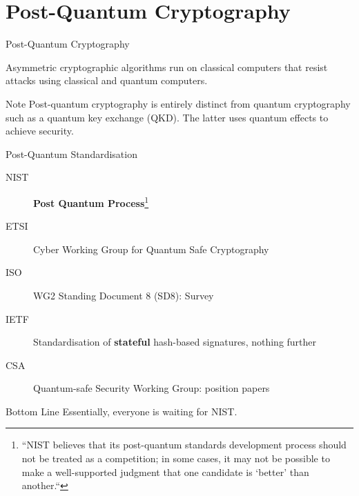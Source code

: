\documentclass[xcolor=table,10pt,aspectratio=169]{beamer}
\begin{document}
\section{Post-Quantum Cryptography}
\label{sec:org4abc2d0}
\begin{frame}[label={sec:orgfceb4e2}]{Post-Quantum Cryptography}
\begin{definition}
Asymmetric cryptographic algorithms run on classical computers that resist attacks using classical and quantum computers.
\end{definition}

\pause

\begin{alertblock}{Note}
Post-quantum cryptography is entirely distinct from quantum cryptography such as a quantum key exchange (QKD). The latter uses quantum effects to achieve security.
\end{alertblock}
\end{frame}

\begin{frame}[label={sec:org74db151}]{Post-Quantum Standardisation}
\begin{description}
\item[{NIST}] \textbf{Post Quantum {\color{lightgray}{Competition} }Process}\footnote{“NIST believes that its post-quantum standards development process should not be treated as a competition; in some cases, it may not be possible to make a well-supported judgment that one candidate is ‘better’ than another.“}
\item[{ETSI}] Cyber Working Group for Quantum Safe Cryptography
\item[{ISO}] WG2 Standing Document 8 (SD8): Survey
\item[{IETF}] Standardisation of \textbf{stateful} hash-based signatures, nothing further
\item[{CSA}] Quantum-safe Security Working Group: position papers
\end{description}

\pause

\begin{alertblock}{Bottom Line}
Essentially, everyone is waiting for NIST.
\end{alertblock}
\end{frame}
\end{document}
